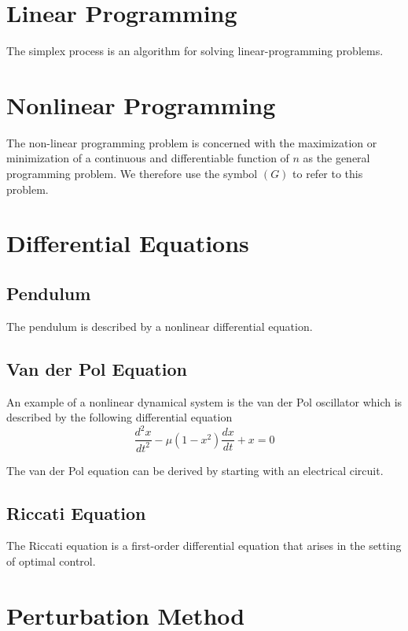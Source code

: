\documentclass[11pt]{report}
\begin{document}
\section{Linear Programming}

The simplex process is an algorithm for solving linear-programming problems.

\section{Nonlinear Programming}

The non-linear programming problem is concerned with the maximization or minimization of a continuous and differentiable function of $n$ as the general programming problem. We therefore use the symbol $(G)$ to refer to this problem.

\section{Differential Equations}

\subsection{Pendulum}

The pendulum is described by a nonlinear differential equation.

\subsection{Van der Pol Equation}

An example of a nonlinear dynamical system is the van der Pol oscillator which is described by the following differential equation
\begin{equation}
	\frac{d^2x}{dt^2}-\mu(1-x^2)\frac{dx}{dt}+x=0
\end{equation}

The van der Pol equation can be derived by starting with an electrical circuit.

\subsection{Riccati Equation}

The Riccati equation is a first-order differential equation that arises in the setting of optimal control.

\section{Perturbation Method}
\end{document}
